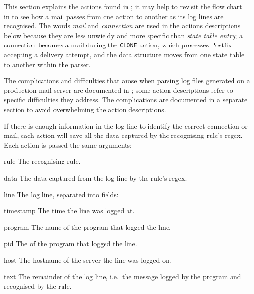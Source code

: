 \label{actions in detail in implementation}

This section explains the actions found in \parsername{}; it may help to
revisit the flow chart in  to see how a mail passes
from one action to another as its log lines are recognised.  The words
\textit{mail\/} and \textit{connection\/} are used in the actions
descriptions below because they are less unwieldy and more specific than
\textit{state table entry\/}; a connection becomes a mail during the
\texttt{CLONE} action, which processes Postfix accepting a delivery
attempt, and the data structure moves from one state table to another
within the parser.

The complications and difficulties that arose when parsing log files
generated on a production mail server are documented in
; some action descriptions refer to specific
difficulties they address.  The complications are documented in a separate
section to avoid overwhelming the action descriptions.

If there is enough information in the log line to identify the correct
connection or mail, each action will save all the data captured by the
recognising rule's regex.  Each action is passed the same arguments:

\begin{boldeqlist}

    \squeezeitems{}

    \item [rule] The recognising rule.

    \item [data] The data captured from the log line by the rule's regex.

    \item [line] The log line, separated into fields:

        \begin{boldeqlist}

            \squeezeitems{}

            \item [timestamp] The time the line was logged at.

            \item [program] The name of the program that logged the line.

            \item [pid] The  of the program that logged the
                line.

            \item [host] The hostname of the server the line was logged on.

            \item [text] The remainder of the log line, i.e.\ the message
                logged by the program and recognised by the rule.

        \end{boldeqlist}

\end{boldeqlist}


